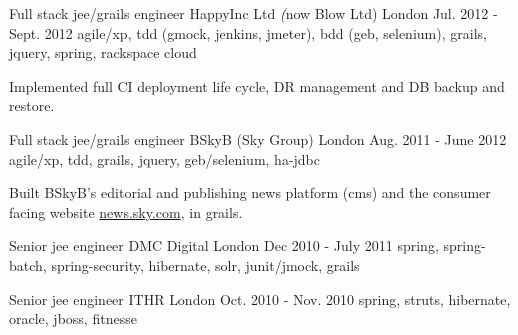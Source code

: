 \begin{cventries}
  \cventry
    {Full stack jee/grails engineer} %
    {\hspace{0.5em}HappyInc Ltd {\textit (now Blow Ltd)}} %
    {London} %
    {Jul. 2012 -Sept. 2012} %
    {agile/xp, tdd (gmock, jenkins, jmeter), bdd (geb, selenium), grails, jquery, spring, rackspace cloud} %
    {
      \begin{cvitems} %
        \item {Implemented full CI deployment life cycle, DR management and DB backup and restore.}
      \end{cvitems}
    }

  \cventry
    {Full stack jee/grails engineer} %
    {\hspace{0.4em}BSkyB (Sky Group)} %
    {London} %
    {Aug. 2011 - June 2012} %
    {agile/xp, tdd, grails, jquery, geb/selenium, ha-jdbc} %
    {
      \begin{cvitems} %
        \item {Built BSkyB's editorial and publishing news platform (cms) and the consumer facing website \url{news.sky.com}, in grails.}
      \end{cvitems}
    }

  \cventry
    {Senior jee engineer} %
    {\hspace{0.5em}DMC Digital} %
    {London} %
    {Dec 2010 - July 2011} %
    {spring, spring-batch, spring-security, hibernate, solr, junit/jmock, grails} %
    {}

  \cventry
    {Senior jee engineer} %
    {\hspace{0.5em}ITHR} %
    {London} %
    {Oct. 2010 - Nov. 2010} %
    {spring, struts, hibernate, oracle, jboss, fitnesse} %
    {}
\end{cventries}

